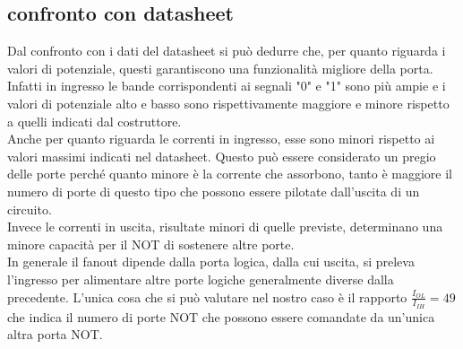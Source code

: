 \subsection{confronto con datasheet}
Dal confronto con i dati del datasheet si può dedurre che, per quanto riguarda i valori di potenziale, questi garantiscono una funzionalità migliore della porta. Infatti in ingresso le bande corrispondenti ai segnali "0" e "1" sono più ampie e i valori di potenziale alto e basso sono rispettivamente maggiore e minore rispetto a quelli indicati dal costruttore.\\
Anche per quanto riguarda le correnti in ingresso, esse sono minori rispetto ai valori massimi indicati nel datasheet. Questo può essere considerato un pregio delle porte perché quanto minore è la corrente che assorbono, tanto è maggiore il numero di porte di questo tipo che possono essere pilotate dall'uscita di un circuito.\\
Invece le correnti in uscita, risultate minori di quelle previste, determinano una minore capacità per il NOT di sostenere altre porte.\\
In generale il fanout dipende dalla porta logica, dalla cui uscita, si preleva l'ingresso per alimentare altre porte logiche generalmente diverse dalla precedente. L'unica cosa che si può valutare nel nostro caso è il rapporto $\frac{I_{OL}}{I_{IH}}= 49$ che indica il numero di porte NOT che possono essere comandate da un'unica altra porta NOT.